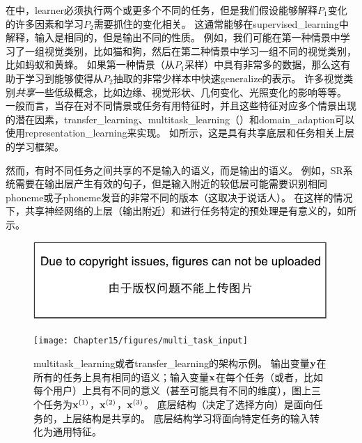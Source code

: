 在中，\gls{learner}必须执行两个或更多个不同的任务，但是我们假设能够解释$P_1$变化的许多因素和学习$P_2$需要抓住的变化相关。
这通常能够在\gls{supervised_learning}中解释，输入是相同的，但是输出不同的性质。
例如，我们可能在第一种情景中学习了一组视觉类别，比如猫和狗，然后在第二种情景中学习一组不同的视觉类别，比如蚂蚁和黄蜂。
如果第一种情景（从$P_1$采样）中具有非常多的数据，那么这有助于学习到能够使得从$P_2$抽取的非常少样本中快速\gls{generalize}的表示。%
许多视觉类别\emph{共享}一些低级概念，比如边缘、视觉形状、几何变化、光照变化的影响等等。
一般而言，当存在对不同情景或任务有用特征时，并且这些特征对应多个情景出现的潜在因素，\gls{transfer_learning}、\gls{multitask_learning}（）和\gls{domain_adaption}可以使用\gls{representation_learning}来实现。
如所示，这是具有共享底层和任务相关上层的学习框架。


然而，有时不同任务之间共享的不是输入的语义，而是输出的语义。
例如，\gls{SR}系统需要在输出层产生有效的句子，但是输入附近的较低层可能需要识别相同\gls{phoneme}或子\gls{phoneme}发音的非常不同的版本（这取决于说话人）。
在这样的情况下，共享神经网络的上层（输出附近）和进行任务特定的预处理是有意义的，如所示。



\begin{figure}[!htb]
\ifOpenSource
\centerline{\includegraphics{figure.pdf}}
\else
\centerline{\texttt{[image: Chapter15/figures/multi\_task\_input]}}
\fi
\caption{\gls{multitask_learning}或者\gls{transfer_learning}的架构示例。
输出变量$\mathbf{y}$在所有的任务上具有相同的语义；输入变量$\mathbf{x}$在每个任务（或者，比如每个用户）上具有不同的意义（甚至可能具有不同的维度），图上三个任务为$\mathbf{x}^{(1)}$，$\mathbf{x}^{(2)}$，$\mathbf{x}^{(3)}$。
底层结构（决定了选择方向）是面向任务的，上层结构是共享的。
底层结构学习将面向特定任务的输入转化为通用特征。
}
\label{fig:chap15_multi_task_input}
\end{figure}


